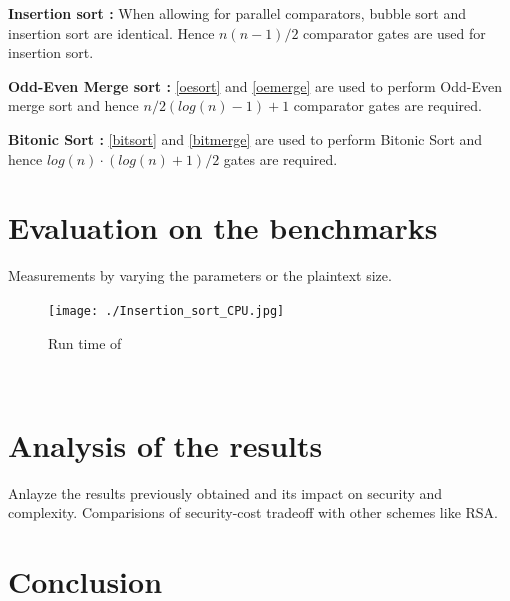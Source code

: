 \documentclass{acm_proc_article-sp}
\begin{document}
\textbf{Insertion sort :} When allowing for parallel comparators, bubble sort and insertion sort are identical. Hence $n(n-1)/2$ comparator gates are used for insertion sort.

\textbf{Odd-Even Merge sort :} \autoref{oesort} and \autoref{oemerge} are used to perform Odd-Even merge sort and hence  $n/2(log(n)-1) + 1 $ comparator gates are required. 


\textbf{Bitonic Sort :} \autoref{bitsort} and \autoref{bitmerge} are used to perform Bitonic Sort and hence $log(n) · (log(n)+1) / 2 $ gates are required.


\lstset{                                    %
  language=C,
  frame=lines,
  captionpos=b
 }


\renewcommand{\lstlistingname}{Code}

\section{Evaluation on the benchmarks}
\label{Sec:Eval}
Measurements by varying the parameters or the plaintext size.

\begin{figure}[!h] %
\centering
\texttt{[image: ./Insertion\_sort\_CPU.jpg]} 
\caption{Run time of } 
\label{image_f2} %
\end{figure}
\





\section{Analysis of the results}
\label{Sec:Analysis}
Anlayze the results previously obtained and its impact on security and complexity. Comparisions of security-cost tradeoff with other schemes like RSA.
\section{Conclusion}




  

\newpage
\end{document}

